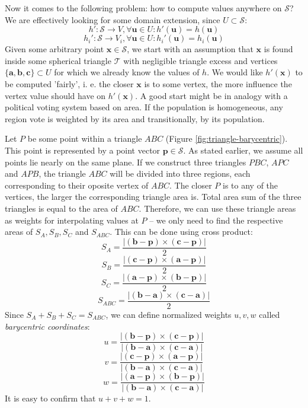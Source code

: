 Now it comes to the following problem: how to compute values anywhere on $\mathcal{S}$? We are effectively looking for some domain extension, since $U\subset\mathcal{S}$:
$$h':\mathcal{S}\rightarrow V, \forall \mathbf{u}\in U:h'(\mathbf{u})=h(\mathbf{u})$$
$$h_i':\mathcal{S}\rightarrow V_i, \forall \mathbf{u}\in U:h_i'(\mathbf{u})=h_i(\mathbf{u})$$
Given some arbitrary point $\mathbf{x}\in\mathcal{S}$, we start with an assumption that $\mathbf{x}$ is found inside some spherical triangle $\mathcal{T}$ with negligible triangle excess and vertices $\{\mathbf{a}, \mathbf{b}, \mathbf{c}\} \subset U$ for which we already know the values of $h$. We would like $h'(\mathbf{x})$ to be computed 'fairly', i. e. the closer $\mathbf{x}$ is to some vertex, the more influence the vertex value should have on $h'(\mathbf{x})$. A good start might be in analogy with a political voting system based on area. If the population is homogeneous, any region vote is weighted by its area and transitionally, by its population.

Let $P$ be some point within a triangle $ABC$ (Figure \ref{fig:triangle-barycentric}). This point is represented by a point vector $\mathbf{p}\in\mathcal{S}$. As stated earlier, we assume all points lie nearly on the same plane. If we construct three triangles $PBC$, $APC$ and $APB$, the triangle $ABC$ will be divided into three regions, each corresponding to their oposite vertex of $ABC$. The closer $P$ is to any of the vertices, the larger the corresponding triangle area is. Total area sum of the three triangles is equal to the area of $ABC$. Therefore, we can use these triangle areas as weights for interpolating values at $P$ -- we only need to find the respective areas of $S_A, S_B, S_C$ and $S_{ABC}$. This can be done using cross product:
$$S_A=\frac{|(\mathbf{b}-\mathbf{p})\times(\mathbf{c}-\mathbf{p})|}{2}$$
$$S_B=\frac{|(\mathbf{c}-\mathbf{p})\times(\mathbf{a}-\mathbf{p})|}{2}$$
$$S_C=\frac{|(\mathbf{a}-\mathbf{p})\times(\mathbf{b}-\mathbf{p})|}{2}$$
$$S_{ABC}=\frac{|(\mathbf{b}-\mathbf{a})\times(\mathbf{c}-\mathbf{a})|}{2}$$
Since $S_A+S_B+S_C=S_{ABC}$, we can define normalized weights $u, v, w$ called \textit{barycentric coordinates}:
$$u=\frac{|(\mathbf{b}-\mathbf{p})\times(\mathbf{c}-\mathbf{p})|}{|(\mathbf{b}-\mathbf{a})\times(\mathbf{c}-\mathbf{a})|}$$
$$v=\frac{|(\mathbf{c}-\mathbf{p})\times(\mathbf{a}-\mathbf{p})|}{|(\mathbf{b}-\mathbf{a})\times(\mathbf{c}-\mathbf{a})|}$$
$$w=\frac{|(\mathbf{a}-\mathbf{p})\times(\mathbf{b}-\mathbf{p})|}{|(\mathbf{b}-\mathbf{a})\times(\mathbf{c}-\mathbf{a})|}$$
It is easy to confirm that $u+v+w=1$.

